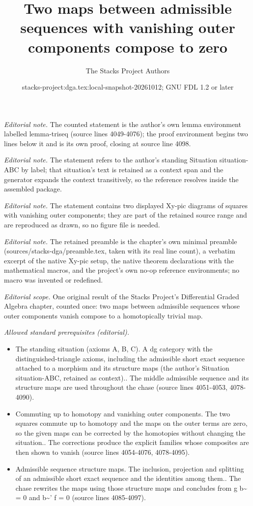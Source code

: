 \documentclass{stacks-project}
\title{Two maps between admissible sequences with vanishing outer components compose to zero}
\author{The Stacks Project Authors}
\date{stacks-project:dga.tex:local-snapshot-20261012; GNU FDL 1.2 or later}
\theoremstyle{plain}
\theoremstyle{definition}
\theoremstyle{remark}
\numberwithin{equation}{subsection}
\begin{document}
\maketitle
\noindent\textit{Editorial note.} The counted statement is the author's own lemma environment labelled lemma-triseq (source lines 4049-4076); the proof environment begins two lines below it and is its own proof, closing at source line 4098.\par\medskip
\noindent\textit{Editorial note.} The statement refers to the author's standing Situation situation-ABC by label; that situation's text is retained as a context span and the generator expands the context transitively, so the reference resolves inside the assembled package.\par\medskip
\noindent\textit{Editorial note.} The statement contains two displayed Xy-pic diagrams of squares with vanishing outer components; they are part of the retained source range and are reproduced as drawn, so no figure file is needed.\par\medskip
\noindent\textit{Editorial note.} The retained preamble is the chapter's own minimal preamble (sources/stacks-dga/preamble.tex, taken with its real line count), a verbatim excerpt of the native Xy-pic setup, the native theorem declarations with the mathematical macros, and the project's own no-op reference environments; no macro was invented or redefined.\par\medskip
\noindent\textit{Editorial scope.} One original result of the Stacks Project's Differential Graded Algebra chapter, counted once: two maps between admissible sequences whose outer components vanish compose to a homotopically trivial map.\par\medskip
\noindent\textit{Allowed standard prerequisites (editorial).}\begin{itemize}
\item The standing situation (axioms A, B, C). A dg category with the distinguished-triangle axioms, including the admissible short exact sequence attached to a morphism and its structure maps (the author's Situation situation-ABC, retained as context).. The middle admissible sequence and its structure maps are used throughout the chase (source lines 4051-4053, 4078-4090).
\item Commuting up to homotopy and vanishing outer components. The two squares commute up to homotopy and the maps on the outer terms are zero, so the given maps can be corrected by the homotopies without changing the situation.. The corrections produce the explicit families whose composites are then shown to vanish (source lines 4054-4076, 4078-4095).
\item Admissible sequence structure maps. The inclusion, projection and splitting of an admissible short exact sequence and the identities among them.. The chase rewrites the maps using those structure maps and concludes from g b\textasciitilde{} = 0 and b\textasciitilde{}' f = 0 (source lines 4085-4097).
\end{itemize}\medskip
\end{document}
